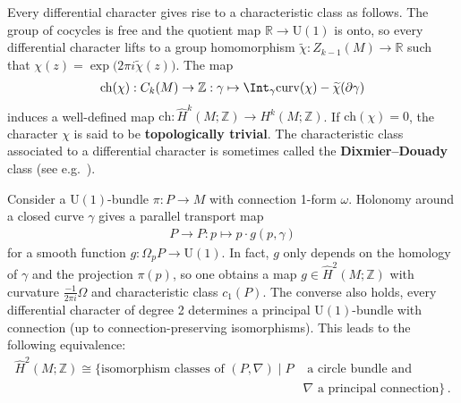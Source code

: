     \begin{property}\label{bundle:characteristic_class}
        Every differential character gives rise to a characteristic class as follows. The group of cocycles is free and the quotient map $\mathbb{R}\rightarrow\mathrm{U}(1)$ is onto, so every differential character lifts to a group homomorphism $\widetilde{\chi}:Z_{k-1}(M)\rightarrow\mathbb{R}$ such that $\chi(z)=\exp\bigl(2\pi i\widetilde{\chi}(z)\bigr)$. The map
        \begin{gather}
            \mathrm{ch}(\chi):C_k(M)\rightarrow\mathbb{Z}:\gamma\mapsto\Int_\gamma\mathrm{curv}(\chi)-\widetilde{\chi}(\partial\gamma)
        \end{gather}
        induces a well-defined map $\mathrm{ch}:\widehat{H}^k(M;\mathbb{Z})\rightarrow H^k(M;\mathbb{Z})$. If $\mathrm{ch}(\chi)=0$, the character $\chi$ is said to be \textbf{topologically trivial}. The characteristic class associated to a differential character is sometimes called the \textbf{Dixmier--Douady} class (see e.g.~\citet{brylinski_loop_1993}).
    \end{property}

    \begin{example}
        Consider a $\mathrm{U}(1)$-bundle $\pi:P\rightarrow M$ with connection 1-form $\omega$. Holonomy around a closed curve $\gamma$ gives a parallel transport map
        \begin{gather}
            P\rightarrow P:p\mapsto p\cdot g(p,\gamma)
        \end{gather}
        for a smooth function $g:\Omega_p P\rightarrow\mathrm{U}(1)$. In fact, $g$ only depends on the homology of $\gamma$ and the projection $\pi(p)$, so one obtains a map $g\in\widehat{H}^2(M;\mathbb{Z})$ with curvature $\frac{-1}{2\pi i}\Omega$ and characteristic class $c_1(P)$. The converse also holds, every differential character of degree 2 determines a principal $\mathrm{U}(1)$-bundle with connection (up to connection-preserving isomorphisms). This leads to the following equivalence:
        \begin{align}
            \widehat{H}^2(M;\mathbb{Z})\cong\{\text{isomorphism classes of }(P,\nabla)\mid P&\text{ a circle bundle and }\\
            &\nabla\text{ a principal connection}\}\,.\nonumber
        \end{align}
    \end{example}

